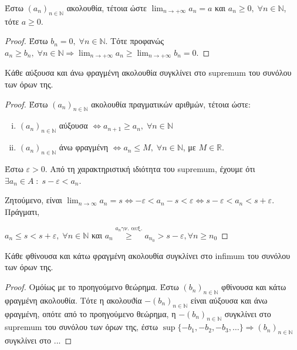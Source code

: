 \documentclass[main.tex]{subfiles}
\begin{document}
\begin{cor}
    Έστω $ (a_{n})_{n \in \mathbb{N}} $ ακολουθία, τέτοια ώστε $ \lim_{n \to +\infty} a_{n} = a$ 
    και $ a_{n} \geq 0, \; \forall n \in \mathbb{N} $, τότε $ a \geq 0 $.
\end{cor}

\begin{proof}
    Έστω $ b_{n} = 0, \; \forall n \in \mathbb{N} $. Τότε προφανώς $ a_{n} \geq b_{n}, \; \forall n
    \in \mathbb{N} \Rightarrow \lim_{n \to +\infty} a_{n} \geq \lim_{n \to +\infty} b_{n} = 0$.
\end{proof}

\begin{thm}
    Κάθε αύξουσα και άνω φραγμένη ακολουθία συγκλίνει στο supremum του συνόλου 
    των όρων της.
\end{thm}

\begin{proof}
    Έστω $ (a_{n})_{n \in \mathbb{N}} $ ακολουθία πραγματικών αριθμών, 
    τέτοια ώστε:
    \begin{enumerate}[i)]
        \item $ (a_{n})_{n \in \mathbb{N}} $ αύξουσα $ \Leftrightarrow 
            a_{n+1} \geq a_{n}, \; \forall n \in \mathbb{N}$ 
        \item $ (a_{n})_{n \in \mathbb{N}} $ άνω  φραγμένη $ \Leftrightarrow 
            a_{n} \leq M, \; \forall n \in \mathbb{N}$, με $ M \in
            \mathbb{R} $.
    \end{enumerate}

Έστω $ \varepsilon >0 $. Από τη χαρακτηριστική ιδιότητα του supremum, έχουμε
ότι $ \exists a_{n} \in A \; : \; s - \varepsilon < a_{n} $.

Ζητούμενο, είναι $ \lim_{n \to \infty} a_{n} = s \Leftrightarrow - 
\varepsilon < a_{n} -s < \varepsilon \Leftrightarrow s - \varepsilon < 
a_{n} < s + \varepsilon $. Πράγματι, 

$ a_{n} \leq s < s + \varepsilon, \; \forall n \in \mathbb{N} $ και 
$ a_{n} \overset{a_{n} \text{γν. αυξ.}}{\geq} a_{n_{0}} > s - \varepsilon, \forall n \geq n_{0} $

\end{proof}

\begin{thm}
    Κάθε φθίνουσα και κάτω φραγμένη ακολουθία συγκλίνει στο infimum του 
    συνόλου των όρων της.
\end{thm}

\begin{proof}
    Ομόίως με το προηγούμενο θεώρημα. Έστω $ (b_{n})_{n \in \mathbb{N}} $ 
    φθίνουσα και κάτω φραγμένη ακολουθία. Τότε η ακολουϑία $ -(b_{n})_{n \in
    \mathbb{N}} $ είναι αύξουσα και άνω φραγμένη, οπότε από το προηγούμενο 
    θεώρημα, η $ -(b_{n})_{n \in \mathbb{N}} $ συγκλίνει στο supremum του 
    συνόλου των όρων της, έστω $ \sup \{ - b_{1}, - b_{2}, -b_{3}, \ldots \}
    \Rightarrow (b_{n})_{n \in \mathbb{N}} $ συγκλίνει στο ... 
\end{proof}
\end{document}
